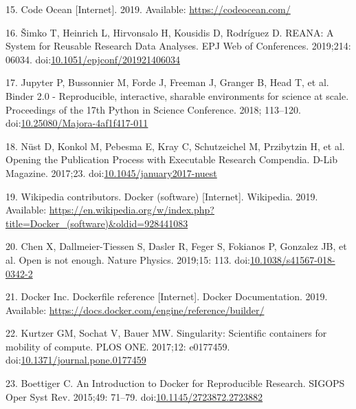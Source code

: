 \documentclass[10pt,letterpaper]{article}
\begin{document}
\leavevmode\hypertarget{ref-code_ocean_2019}{}%
15. Code Ocean {[}Internet{]}. 2019. Available:
\url{https://codeocean.com/}

\leavevmode\hypertarget{ref-simko_reana_2019}{}%
16. Šimko T, Heinrich L, Hirvonsalo H, Kousidis D, Rodríguez D. REANA: A
System for Reusable Research Data Analyses. EPJ Web of Conferences.
2019;214: 06034.
doi:\href{https://doi.org/10.1051/epjconf/201921406034}{10.1051/epjconf/201921406034}

\leavevmode\hypertarget{ref-jupyter_binder_2018}{}%
17. Jupyter P, Bussonnier M, Forde J, Freeman J, Granger B, Head T, et
al. Binder 2.0 - Reproducible, interactive, sharable environments for
science at scale. Proceedings of the 17th Python in Science Conference.
2018; 113--120.
doi:\href{https://doi.org/10.25080/Majora-4af1f417-011}{10.25080/Majora-4af1f417-011}

\leavevmode\hypertarget{ref-nust_opening_2017}{}%
18. Nüst D, Konkol M, Pebesma E, Kray C, Schutzeichel M, Przibytzin H,
et al. Opening the Publication Process with Executable Research
Compendia. D-Lib Magazine. 2017;23.
doi:\href{https://doi.org/10.1045/january2017-nuest}{10.1045/january2017-nuest}

\leavevmode\hypertarget{ref-wikipedia_contributors_docker_2019}{}%
19. Wikipedia contributors. Docker (software) {[}Internet{]}. Wikipedia.
2019. Available:
\url{https://en.wikipedia.org/w/index.php?title=Docker_(software)\&oldid=928441083}

\leavevmode\hypertarget{ref-chen_open_2019}{}%
20. Chen X, Dallmeier-Tiessen S, Dasler R, Feger S, Fokianos P, Gonzalez
JB, et al. Open is not enough. Nature Physics. 2019;15: 113.
doi:\href{https://doi.org/10.1038/s41567-018-0342-2}{10.1038/s41567-018-0342-2}

\leavevmode\hypertarget{ref-docker_inc_dockerfile_2019}{}%
21. Docker Inc. Dockerfile reference {[}Internet{]}. Docker
Documentation. 2019. Available:
\url{https://docs.docker.com/engine/reference/builder/}

\leavevmode\hypertarget{ref-kurtzer_singularity_2017}{}%
22. Kurtzer GM, Sochat V, Bauer MW. Singularity: Scientific containers
for mobility of compute. PLOS ONE. 2017;12: e0177459.
doi:\href{https://doi.org/10.1371/journal.pone.0177459}{10.1371/journal.pone.0177459}

\leavevmode\hypertarget{ref-boettiger_introduction_2015}{}%
23. Boettiger C. An Introduction to Docker for Reproducible Research.
SIGOPS Oper Syst Rev. 2015;49: 71--79.
doi:\href{https://doi.org/10.1145/2723872.2723882}{10.1145/2723872.2723882}
\end{document}

